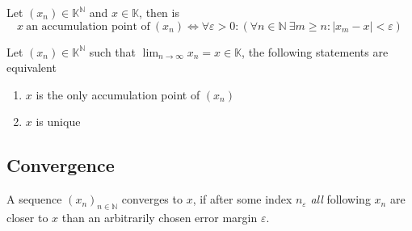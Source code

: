 


\begin{theorem}
   Let \((x_n) \in \mathbb{K}^\mathbb{N}\) and \(x \in \mathbb{K}\), then is
   \[x~\text{an accumulation point of}~(x_n) \iff \forall \varepsilon > 0: (\forall n \in \mathbb{N}~\exists m \geq n: |x_m - x| < \varepsilon)\]
\end{theorem}

\begin{theorem}
   Let \((x_n) \in \mathbb{K}^\mathbb{N}\) such that \(\lim_{n \to \infty} x_n = x \in \mathbb{K}\), the following statements are equivalent
   \begin{enumerate}[label=\roman*, align=Center]
      \item \(x\) is the only accumulation point of \((x_n)\)
      \item \(x\) is unique
   \end{enumerate}
\end{theorem}

\subsection{Convergence}
A sequence \((x_n)_{n \in \mathbb{N}}\) converges to \(x\), if after some index \(n_\varepsilon\) \emph{all} following \(x_n\) are closer to \(x\) than an arbitrarily chosen error margin \(\varepsilon\).

